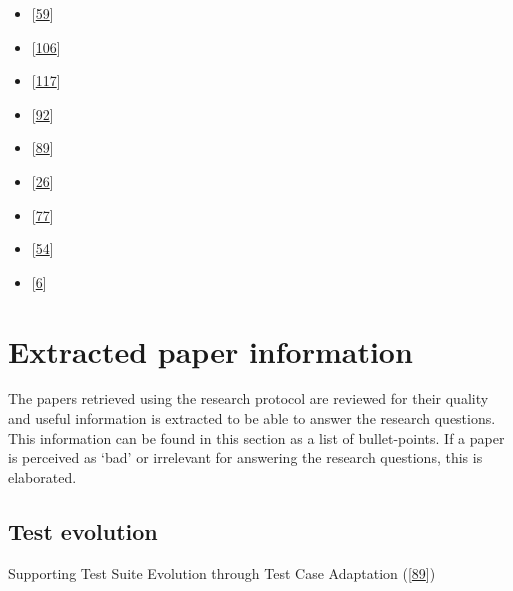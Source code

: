 \documentclass[]{book}
\providecommand{\tightlist}{%
  \setlength{\itemsep}{0pt}\setlength{\parskip}{0pt}}
\begin{document}
\begin{itemize}
  \begin{itemize}
  \tightlist
  \item
    {[}\protect\hyperlink{ref-hemmati2018}{59}{]}
  \item
    {[}\protect\hyperlink{ref-shamshiri2018automatically}{106}{]}
  \item
    {[}\protect\hyperlink{ref-vernotte2015}{117}{]}
  \item
    {[}\protect\hyperlink{ref-noor2015test}{92}{]}
  \item
    {[}\protect\hyperlink{ref-supportingtestsuite}{89}{]}
  \item
    {[}\protect\hyperlink{ref-bowring2014obsidian}{26}{]}
  \item
    {[}\protect\hyperlink{ref-leung2015testing}{77}{]}
  \item
    {[}\protect\hyperlink{ref-greiler2013}{54}{]}
  \item
    {[}\protect\hyperlink{ref-atifi2017}{6}{]}
  \end{itemize}
\end{itemize}

\section{Extracted paper information}\label{extracted-paper-information}

The papers retrieved using the research protocol are reviewed for their
quality and useful information is extracted to be able to answer the
research questions. This information can be found in this section as a
list of bullet-points. If a paper is perceived as `bad' or irrelevant
for answering the research questions, this is elaborated.

\subsection{Test evolution}\label{test-evolution}

Supporting Test Suite Evolution through Test Case Adaptation
({[}\protect\hyperlink{ref-supportingtestsuite}{89}{]})
\end{document}
